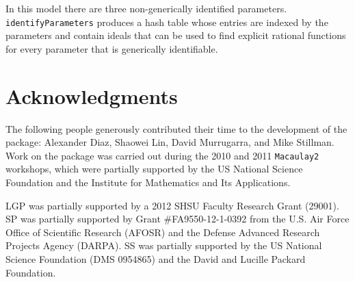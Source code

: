 \documentclass[letterpaper]{article}
\theoremstyle{plain}
\theoremstyle{definition}
\begin{document}
In this model there are three non-generically identified parameters.  \texttt{identifyParameters} produces a hash table whose entries
are indexed by the parameters and contain ideals that can be used to find
explicit rational functions for every parameter that is generically
identifiable.

\section*{Acknowledgments }
The following people generously contributed their time to the
development of the package:  Alexander Diaz, Shaowei Lin, David Murrugarra, and Mike 
Stillman.  Work on the package was carried out during the 2010 and 2011
{\tt Macaulay2} workshops, which were partially supported by the US National 
Science Foundation and the Institute for Mathematics and Its
Applications.

LGP was partially supported by a 2012 SHSU Faculty Research Grant (29001).
SP was partially supported by Grant \#FA9550-12-1-0392 from the U.S. Air Force Office of Scientific Research (AFOSR) and the Defense Advanced Research Projects Agency (DARPA).
SS was partially supported by the US National Science Foundation (DMS 0954865) and the David and Lucille Packard Foundation.
\end{document}
